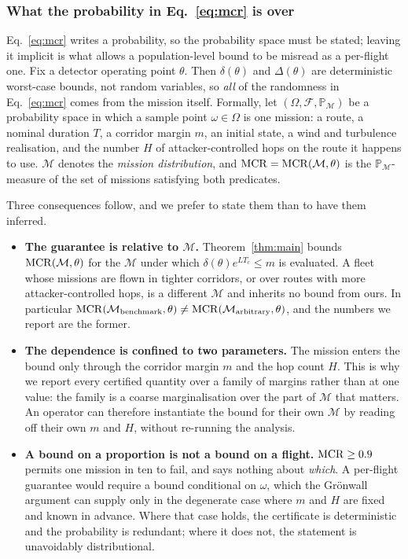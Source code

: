 \subsubsection*{What the probability in Eq.~\eqref{eq:mcr} is over}
\label{sec:probspace}
Eq.~\eqref{eq:mcr} writes a probability, so the probability space must be
stated; leaving it implicit is what allows a population-level bound to be
misread as a per-flight one. Fix a detector operating point $\theta$. Then
$\delta(\theta)$ and $\Delta(\theta)$ are deterministic worst-case bounds, not
random variables, so \emph{all} of the randomness in Eq.~\eqref{eq:mcr} comes
from the mission itself. Formally, let $(\Omega,\mathcal{F},\mathbb{P}_{\mathcal{M}})$
be a probability space in which a sample point $\omega\in\Omega$ is one mission:
a route, a nominal duration $T$, a corridor margin $m$, an initial state, a wind
and turbulence realisation, and the number $H$ of attacker-controlled hops on
the route it happens to use. $\mathcal{M}$ denotes the \emph{mission
distribution}, and $\mathrm{MCR}=\mathrm{MCR}(\mathcal{M},\theta)$ is the
$\mathbb{P}_{\mathcal{M}}$-measure of the set of missions satisfying both
predicates.

Three consequences follow, and we prefer to state them than to have them
inferred.

\begin{itemize}
\item \textbf{The guarantee is relative to $\mathcal{M}$.} Theorem~\ref{thm:main}
bounds $\mathrm{MCR}(\mathcal{M},\theta)$ for the $\mathcal{M}$ under which
$\delta(\theta)e^{LT_c}\le m$ is evaluated. A fleet whose missions are flown in
tighter corridors, or over routes with more attacker-controlled hops, is a
different $\mathcal{M}$ and inherits no bound from ours. In particular
$\mathrm{MCR}(\mathcal{M}_{\text{benchmark}},\theta)\neq\mathrm{MCR}(\mathcal{M}_{\text{arbitrary}},\theta)$,
and the numbers we report are the former.
\item \textbf{The dependence is confined to two parameters.} The mission enters
the bound only through the corridor margin $m$ and the hop count $H$. This is
why we report every certified quantity over a family of margins rather than at
one value: the family is a coarse marginalisation over the part of $\mathcal{M}$
that matters. An operator can therefore instantiate the bound for their own
$\mathcal{M}$ by reading off their own $m$ and $H$, without re-running the
analysis.
\item \textbf{A bound on a proportion is not a bound on a flight.} $\mathrm{MCR}\ge0.9$
permits one mission in ten to fail, and says nothing about \emph{which}. A
per-flight guarantee would require a bound conditional on $\omega$, which the
Gr\"onwall argument can supply only in the degenerate case where $m$ and $H$ are
fixed and known in advance. Where that case holds, the certificate is
deterministic and the probability is redundant; where it does not, the statement
is unavoidably distributional.
\end{itemize}

